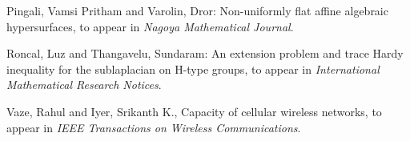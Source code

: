 \item\label{pingali:algebraic-hypersurfaces} Pingali, Vamsi Pritham and Varolin, Dror: Non-uniformly flat affine algebraic hypersurfaces, to appear in {\em Nagoya Mathematical Journal}.

\item\label{thangavelu:H-type-groups} Roncal, Luz and Thangavelu, Sundaram: An extension problem and trace Hardy
      inequality for the sublaplacian on H-type groups, to appear in {\em International Mathematical Research Notices}.

\item\label{iyer:wireless-networks} Vaze, Rahul and Iyer, Srikanth K., Capacity of cellular wireless networks,
      to appear in {\em IEEE Transactions on Wireless Communications}.
